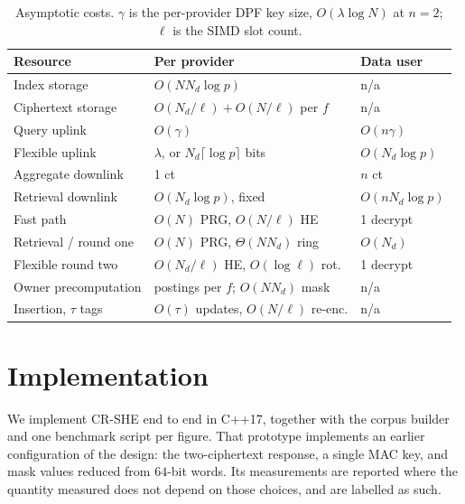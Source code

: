 \documentclass[a4paper,fleqn]{cas-sc}
\newif\ifauthorchecks
\newcommand{\authorcheck}[1]{\ifauthorchecks{\color{red}\textsf{[Authors: #1]}}\fi}
\begin{document}
\begin{table}[pos=htbp]
\caption{Asymptotic costs. $\gamma$ is the per-provider DPF key size,
$O(\lambda\log N)$ at $n=2$; $\ell$ is the SIMD slot count.}
\label{tab:complexity}
\centering
\scriptsize
\setlength{\tabcolsep}{2pt}
\renewcommand{\arraystretch}{1.2}
\begin{tabular*}{\tblwidth}{@{\extracolsep{\fill}}lll@{}}
\toprule
Resource & Per provider & Data user \\
\midrule
Index storage           & $O(N N_d\log p)$                  & n/a \\
Ciphertext storage      & $O(N_d/\ell)+O(N/\ell)$ per $f$   & n/a \\
Query uplink            & $O(\gamma)$                       & $O(n\gamma)$ \\
Flexible uplink         & $\lambda$, or $N_d\lceil\log p\rceil$ bits & $O(N_d\log p)$ \\
Aggregate downlink      & 1 ct                              & $n$ ct \\
Retrieval downlink      & $O(N_d\log p)$, fixed             & $O(nN_d\log p)$ \\
Fast path               & $O(N)$ PRG, $O(N/\ell)$ HE        & 1 decrypt \\
Retrieval / round one   & $O(N)$ PRG, $\Theta(NN_d)$ ring   & $O(N_d)$ \\
Flexible round two      & $O(N_d/\ell)$ HE, $O(\log\ell)$ rot.& 1 decrypt \\
Owner precomputation    & postings per $f$; $O(NN_d)$ mask  & n/a \\
Insertion, $\tau$ tags  & $O(\tau)$ updates, $O(N/\ell)$ re-enc. & n/a \\
\bottomrule
\end{tabular*}
\end{table}

\section{Implementation}
\label{sec:impl}

We implement CR-SHE end to end in C++17, together with the corpus builder
and one benchmark script per figure. That prototype implements an earlier
configuration of the design: the two-ciphertext response, a single MAC key,
and mask values reduced from $64$-bit words. Its measurements are reported
where the quantity measured does not depend on those choices, and are labelled
as such.
\authorcheck{Publish the C++ prototype next to the reference implementation,
and re-measure in it the items marked below.}
\end{document}
